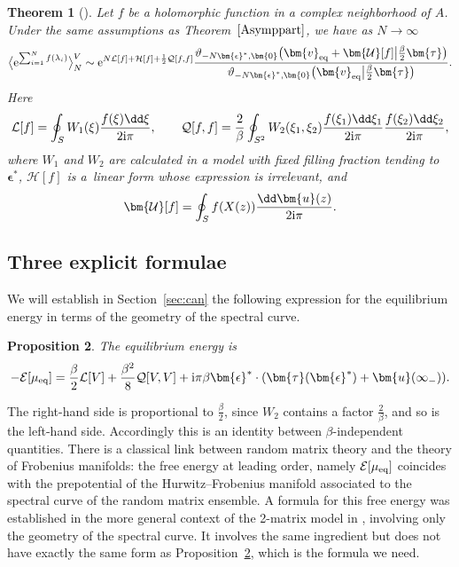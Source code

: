 \documentclass[10pt,a4paper]{amsart}
\numberwithin{equation}{section}
\newtheorem{Theorem}{Theorem}[section]
\newtheorem{prop}[Theorem]{Proposition}
 { \theoremstyle{definition}
\newtheorem{Definition}[Theorem]{Definition}
\newtheorem{Note}[Theorem]{Note}
\newtheorem{Example}[Theorem]{Example}
\newtheorem{Remark}[Theorem]{Remark} }
\newcommand{\ee}{\mathrm{e}}
\begin{document}
\begin{Theorem}[{\cite[Theorem 1.6]{BGmulti}}]\label{thm:clt}
 Let $f$ be a holomorphic function in a complex neighborhood of $A$. Under the same assumptions as Theorem~$\ref{Asymppart}$, we have as $N \to \infty$
\[
\bigl\langle\ee^{\sum_{i=1}^{N}f(\lambda_i)}\bigr\rangle^{V}_{N} \sim{\rm e}^{N\mathcal{L}[f] + \mathcal{H}[f] + \frac{1}{2}\mathcal{Q}[f,f]} \frac{\vartheta_{-N\bm{\epsilon}^{*},\bm{0}}\bigl(\bm{v}_{{\rm eq}} + \bm{\mathcal{U}}[f] \big| \frac{\beta}{2}\bm{\tau}\bigr)}{\vartheta_{-N\bm{\epsilon}^{*},\bm{0}}\bigl(\bm{v}_{{\rm eq}} \big| \frac{\beta}{2}\bm{\tau}\bigr)} .
\]
Here
\[
\mathcal{L}[f] = \oint_{S} W_1(\xi)\frac{f(\xi)\dd\xi}{2{\rm i}\pi}, \qquad
\mathcal{Q}[f,f] = \frac{2}{\beta} \oint_{S^2} W_{2}(\xi_1,\xi_2) \frac{f(\xi_1)\dd \xi_1}{2{\rm i}\pi} \frac{f(\xi_2)\dd \xi_2}{2{\rm i}\pi},
\]
where $W_1$ and $W_2$ are calculated in a model with fixed filling fraction tending to $\bm{\epsilon}^*$,
$\mathcal{H}[f]$ is a~linear form whose expression is irrelevant, and
\[
\bm{\mathcal{U}}[f] = \oint_{S} f(X(z)) \frac{ \dd \bm{u}(z)}{2{\rm i}\pi}.
\]
\end{Theorem}


\subsection{Three explicit formulae}

We will establish in Section~\ref{sec:can} the following expression for the equilibrium energy in terms of the geometry of the spectral curve.
\begin{prop} \label{lem:Ef0} The equilibrium energy is
\[
-\mathcal{E}[\mu_{{\rm eq}}] = \frac{\beta}{2}\mathcal{L}[V] + \frac{\beta^2}{8}\mathcal{Q}[V,V] + {\rm i}\pi \beta \bm{\epsilon}^* \cdot  (\bm{\tau}(\bm{\epsilon}^*) + \bm{u}(\infty_-) ).
\]
\end{prop}
The right-hand side is proportional to $\frac{\beta}{2}$, since $W_2$ contains a factor $\frac{2}{\beta}$, and so is the left-hand side. Accordingly this is an identity between $\beta$-independent quantities. There is a classical link between random matrix theory and the theory
of Frobenius manifolds: the free energy at leading order,
namely $\mathcal{E}[\mu_{{\rm eq}}]$ coincides with the
prepotential of the Hurwitz--Frobenius manifold associated to the
spectral curve of the random matrix ensemble. A formula for this free energy was established in the more general context of the 2-matrix model in \cite{Bertola}, involving only the geometry of the spectral curve. It involves the same ingredient but does not have exactly the same form as Proposition~\ref{lem:Ef0}, which is the formula we need.
\end{document}
